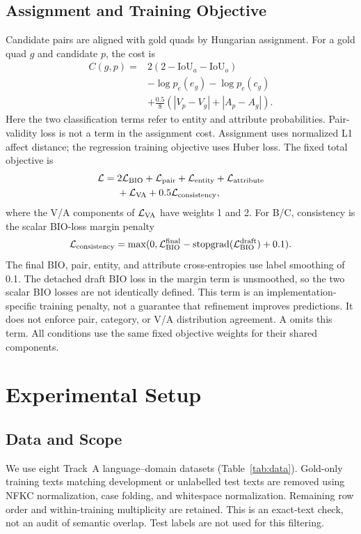 \documentclass[conference]{IEEEtran}
\begin{document}
\subsection{Assignment and Training Objective}
Candidate pairs are aligned with gold quads by Hungarian assignment. For a gold quad $g$ and candidate $p$, the cost is
\begin{align}
 C(g,p)={}&2(2-\mathrm{IoU}_a-\mathrm{IoU}_o)\nonumber\\
 &-\log p_e(e_g)-\log p_c(c_g)\nonumber\\
 &+\frac{0.5}{8}(|V_p-V_g|+|A_p-A_g|).
\end{align}
Here the two classification terms refer to entity and attribute probabilities. Pair-validity loss is not a term in the assignment cost. Assignment uses normalized L1 affect distance; the regression training objective uses Huber loss. The fixed total objective is
\begin{align}
\mathcal L={}&2\mathcal L_{\rm BIO}+\mathcal L_{\rm pair}
 +\mathcal L_{\rm entity}+\mathcal L_{\rm attribute}\nonumber\\
 &+\mathcal L_{\rm VA}+0.5\mathcal L_{\rm consistency},
\end{align}
where the V/A components of $\mathcal L_{\rm VA}$ have weights 1 and 2. For B/C, consistency is the scalar BIO-loss margin penalty
\begin{equation}
\mathcal L_{\rm consistency}=\max(0,\mathcal L_{\rm BIO}^{\rm final}
-\operatorname{stopgrad}(\mathcal L_{\rm BIO}^{\rm draft})+0.1).
\end{equation}
The final BIO, pair, entity, and attribute cross-entropies use label smoothing of 0.1. The detached draft BIO loss in the margin term is unsmoothed, so the two scalar BIO losses are not identically defined. This term is an implementation-specific training penalty, not a guarantee that refinement improves predictions. It does not enforce pair, category, or V/A distribution agreement. A omits this term. All conditions use the same fixed objective weights for their shared components.

\section{Experimental Setup}
\subsection{Data and Scope}

We use eight Track~A language--domain datasets (Table~\ref{tab:data}). Gold-only training texts matching development or unlabelled test texts are removed using NFKC normalization, case folding, and whitespace normalization. Remaining row order and within-training multiplicity are retained. This is an exact-text check, not an audit of semantic overlap. Test labels are not used for this filtering.
\end{document}
